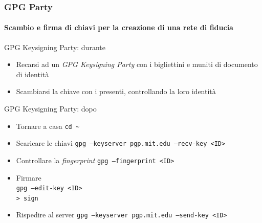 \documentclass{beamer}
\begin{document}
\begin{frame}
  \frametitle{GPG Party}
  \framesubtitle{Scambio e firma di chiavi per la creazione di una rete di fiducia}

  \begin{exampleblock}{GPG Keysigning Party: durante}
    \begin{itemize}
      \item Recarsi ad un \emph{GPG Keysigning Party} con i bigliettini
            e muniti di documento di identità
      \item Scambiarsi la chiave con i presenti, controllando la loro identità
    \end{itemize}
  \end{exampleblock}

  \pause

  \begin{exampleblock}{GPG Keysigning Party: dopo}
    \begin{itemize}
      \item Tornare a casa \tiny \texttt{cd \~} \normalsize
      \item Scaricare le chiavi
            \tiny \texttt{gpg --keyserver pgp.mit.edu --recv-key <ID>} \normalsize
      \item Controllare la \emph{fingerprint}
            \tiny \texttt{gpg --fingerprint <ID>} \normalsize
      \item Firmare\\
            \tiny \texttt{gpg --edit-key <ID>\\ > sign} \normalsize
      \item Rispedire al server
            \tiny \texttt{gpg --keyserver pgp.mit.edu --send-key <ID>} \normalsize
    \end{itemize}
  \end{exampleblock}

\end{frame}
\end{document}
